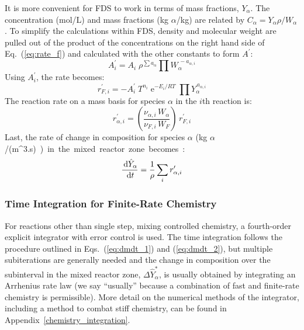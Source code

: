 It is more convenient for FDS to work in terms of mass fractions, $Y_{\alpha}$.  The concentration (mol/L) and mass fractions (kg $\alpha$/kg) are related by $C_{\alpha}=Y_{\alpha} \rho/W_{\alpha}$.
To simplify the calculations within FDS, density and molecular weight are pulled out of the product of the concentrations on the right hand side of Eq.~(\ref{eq:rate_f}) and calculated with the other constants to form $A^{\prime}$:
\begin{equation}\label{eq:aprime}
A^{\prime}_{i} = A_{i}\;\rho^{\sum a_{\alpha}}\prod W_{\alpha}^{\,-a_{\alpha,i}}
\end{equation}
Using $A_i^{\prime}$, the rate becomes:
\begin{equation}\label{eq:finite_rate_fin}
r^{\prime}_{F,i} = -A_i^{\prime}\;T^{n_i}\;\mathrm{e}^{-E_i/RT}\;\prod Y_{\alpha}^{\,a_{\alpha,i}}
\end{equation}
The reaction rate on a mass basis for species $\alpha$ in the $i$th reaction is:
\begin{equation}\label{eq:rate_a_y}
r^{\prime}_{\alpha,i}= \left(\frac{\nu_{\alpha,i}\,W_{\alpha}}{\nu_{F,i}\,W_{F}}\right)\,r^{\prime}_{F,i}
\end{equation}
Last, the rate of change in composition for species $\alpha$ (\si{kg $\alpha$/(m^3.s)}) in the mixed reactor zone becomes:
\begin{equation}\label{rate_expression_y}
\frac{\,\mathrm{d} \hat{Y}_{\alpha}}{\,\mathrm{d} t} = \frac{1}{\rho}\sum_{i} r^{\prime}_{\alpha,i}
\end{equation}

\subsubsection{Time Integration for Finite-Rate Chemistry}

For reactions other than single step, mixing controlled chemistry, a fourth-order explicit integrator with error control is used. The time integration follows the procedure outlined in Eqs.~(\ref{eq:dmdt_1}) and (\ref{eq:dmdt_2}), but multiple subiterations are generally needed and the change in composition over the subinterval in the mixed reactor zone, $\Delta \hat{Y}_\alpha^*$, is usually obtained by integrating an Arrhenius rate law (we say ``usually'' because a combination of fast and finite-rate chemistry is permissible). More detail on the numerical methods of the integrator, including a method to combat stiff chemistry, can be found in Appendix~\ref{chemistry_integration}.


